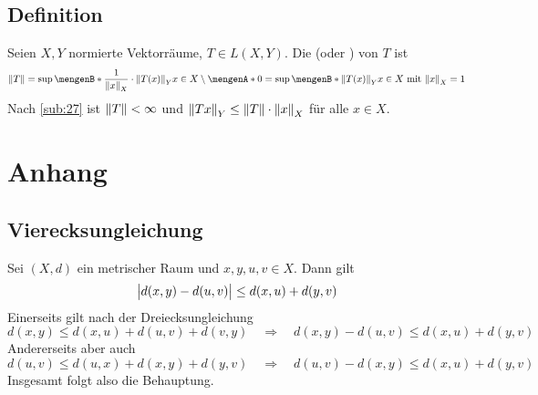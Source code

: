 \subsection[Definition: Operatornorm]{Definition} %
\label{sub:28}
Seien $X,Y$ normierte Vektorräume, $T \in L(X,Y)$. Die  (oder ) von $T$ ist
\[
	\norm{T} = \sup \set[{\frac{1}{\norm[X]{x}} \cdot \norm[Y]{T(x)}}]{x \in X \setminus \set{0} } = \sup \set[{\norm[Y]{T(x)} }]{x \in X \text{ mit } \norm[X]{x} = 1}   
\] 
Nach \ref{sub:27} ist $\norm{T}<  \infty $ und $\norm[Y]{T x} \le \norm{T} \cdot \norm[X]{x}$ für alle $x \in X$.




\cleardoubleoddemptypage
\appendix
\section{Anhang} %
\label{sec:anhang}

\subsection{Vierecksungleichung} %
\label{sub:vier_ungl}
Sei $(X,d)$ ein metrischer Raum und $x,y,u,v \in X$. Dann gilt
\[
	\abs[\big]{d(x,y) - d(u,v)} \le d(x,u) + d(y,v) 
\]
Einerseits gilt nach der Dreiecksungleichung
\[
	d(x,y) \le d(x,u) + d(u,v) + d(v,y) \quad \Longrightarrow \quad d(x,y) - d(u,v) \le d(x,u) + d(y,v)
\]
Andererseits aber auch
\[
	d(u,v) \le d(u,x) + d(x,y) + d(y,v) \quad \Longrightarrow \quad d(u,v) - d(x,y) \le d(x,u) + d(y,v)
\]
Insgesamt folgt also die Behauptung. \bewende

\cleardoubleoddemptypage
{}
\setcounter{page}{1}
\printindex
\listoffigures

